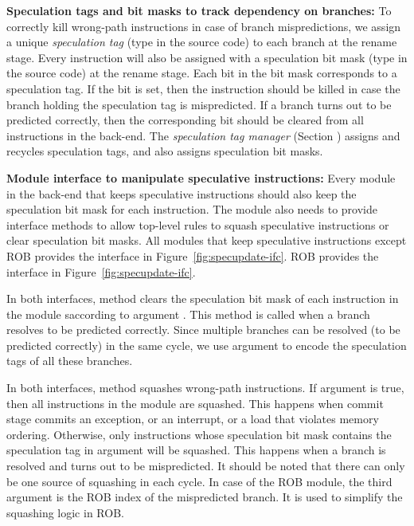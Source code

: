 \noindent\textbf{Speculation tags and bit masks to track dependency on branches:}
To correctly kill wrong-path instructions in case of branch mispredictions, we assign a unique \emph{speculation tag} (type  in the source code) to each branch at the rename stage.
Every instruction will also be assigned with a speculation bit mask (type  in the source code) at the rename stage.
Each bit in the bit mask corresponds to a speculation tag.
If the bit is set, then the instruction should be killed in case the branch holding the speculation tag is mispredicted.
If a branch turns out to be predicted correctly, then the corresponding bit should be cleared from all instructions in the back-end. 
The \emph{speculation tag manager} (Section ) assigns and recycles speculation tags, and also assigns speculation bit masks.

\noindent\textbf{Module interface to manipulate speculative instructions:}
Every module in the back-end that keeps speculative instructions should also keep the speculation bit mask for each instruction.
The module also needs to provide interface methods to allow top-level rules to squash speculative instructions or clear speculation bit masks.
All modules that keep speculative instructions except ROB provides the  interface in Figure~\ref{fig:specupdate-ifc}.
ROB provides the  interface in Figure~\ref{fig:specupdate-ifc}.

In both interfaces, method  clears the speculation bit mask of each instruction in the module saccording to argument .
This method is called when a branch resolves to be predicted correctly.
Since multiple branches can be resolved (to be predicted correctly) in the same cycle, we use argument  to encode the speculation tags of all these branches.

In both interfaces, method  squashes wrong-path instructions.
If argument  is true, then all instructions in the module are squashed.
This happens when commit stage commits an exception, or an interrupt, or a load that violates memory ordering.
Otherwise, only instructions whose speculation bit mask contains the speculation tag in argument  will be squashed.
This happens when a branch is resolved and turns out to be mispredicted.
It should be noted that there can only be one source of squashing in each cycle.
In case of the ROB module, the third argument  is the ROB index of the mispredicted branch.
It is used to simplify the squashing logic in ROB.

